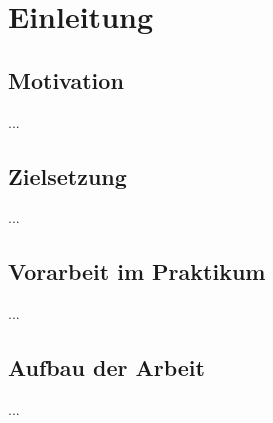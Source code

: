 \chapter{Einleitung}


\section{Motivation}

...

\section{Zielsetzung}

...

\section{Vorarbeit im Praktikum}

...

\section{Aufbau der Arbeit}

...
